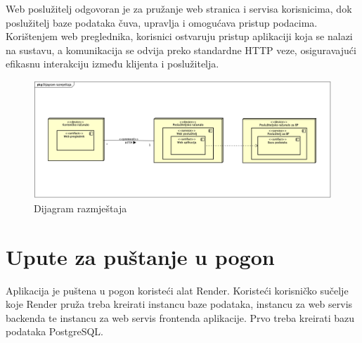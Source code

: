 			Web poslužitelj odgovoran je za pružanje web stranica i servisa korisnicima, dok poslužitelj baze podataka čuva, upravlja i omogućava pristup podacima. Korištenjem web preglednika, korisnici ostvaruju pristup aplikaciji koja se nalazi na sustavu, a komunikacija se odvija preko standardne HTTP veze, osiguravajući efikasnu interakciju između klijenta i poslužitelja.
			
			\begin{figure}[H]
				\includegraphics[scale=0.35]{dijagrami/dijagram_razmjestaja.png} %
				\centering
				\caption{Dijagram razmještaja}
				\label{fig:promjene}
			\end{figure}
			
			\eject 
		
		\section{Upute za puštanje u pogon}
		
		Aplikacija je puštena u pogon koristeći alat Render. Koristeći korisničko sučelje koje Render pruža treba kreirati instancu baze podataka, instancu za web servis backenda te instancu za web servis frontenda aplikacije. Prvo treba kreirati bazu podataka PostgreSQL.
			
